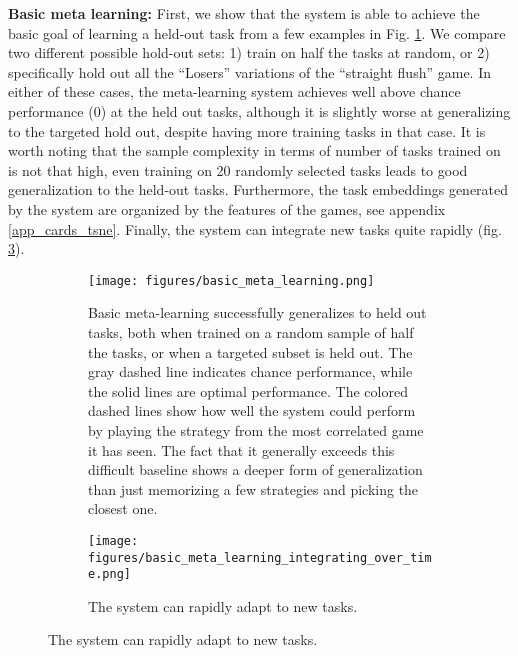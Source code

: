 \documentclass{article}
\begin{document}
\textbf{Basic meta learning:} First, we show that the system is able to achieve the basic goal of learning a held-out task from a few examples in Fig. \ref{cards_basic_results}. We compare two different possible hold-out sets: 1) train on half the tasks at random, or 2) specifically hold out all the ``Losers'' variations of the ``straight flush'' game. In either of these cases, the meta-learning system achieves well above chance performance (0) at the held out tasks, although it is slightly worse at generalizing to the targeted hold out, despite having more training tasks in that case. It is worth noting that the sample complexity in terms of number of tasks trained on is not that high, even training on 20 randomly selected tasks leads to good generalization to the held-out tasks. Furthermore, the task embeddings generated by the system are organized by the features of the games, see appendix \ref{app_cards_tsne}. Finally, the system can integrate new tasks quite rapidly (fig. \ref{cards_basic_integration_results}).\par
\begin{figure}
\centering
\begin{subfigure}[t]{0.5\textwidth}
\texttt{[image: figures/basic\_meta\_learning.png]}
\caption{Basic meta-learning successfully generalizes to held out tasks, both when trained on a random sample of half the tasks, or when a targeted subset is held out. The gray dashed line indicates chance performance, while the solid lines are optimal performance. The colored dashed lines show how well the system could perform by playing the strategy from the most correlated game it has seen. The fact that it generally exceeds this difficult baseline shows a deeper form of generalization than just memorizing a few strategies and picking the closest one.}
\label{cards_basic_results}
\end{subfigure}%
\begin{subfigure}[t]{0.5\textwidth}
\texttt{[image: figures/basic\_meta\_learning\_integrating\_over\_time.png]}
\caption{The system can rapidly adapt to new tasks.}
\label{cards_basic_integration_results}
\end{subfigure}
\end{figure}
\end{document}
